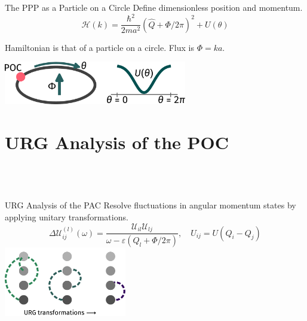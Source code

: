 \documentclass[aspectratio=169]{beamer}
\begin{document}
\begin{frame}{The PPP as a Particle on a Circle}
	Define dimensionless position and momentum.
	\[\mathcal{H}(k) = \frac{\hbar^2}{2ma^2}\left(\hat Q + \Phi/2\pi\right)^2 + U(\theta)\]

	\vspace*{\fill}
	Hamiltonian is that of a \alert{particle on a circle}. Flux is \(\Phi = ka\).

	\vspace*{\fill}
	\includegraphics[width=0.6\textwidth]{POC.pdf}
\end{frame}

\section{URG Analysis of the POC}
\subsection{~}

\begin{frame}{URG Analysis of the PAC}
	\alert{Resolve fluctuations} in angular momentum states by applying unitary transformations.
	\[\Delta \mathcal{U}_{ij}^{(l)}(\omega) = \frac{\mathcal{U}_{il}\mathcal{U}_{lj}}{\omega - \varepsilon(Q_l + \Phi/2\pi)},\quad U_{ij} = U(Q_i - Q_j)\]
	\includegraphics[width=0.4\textwidth]{URG_poc.pdf}
\end{frame}
\end{document}
